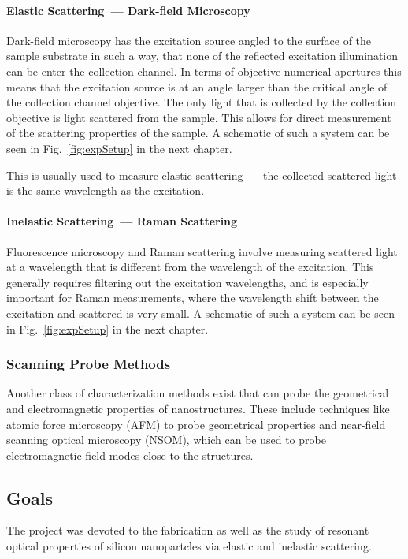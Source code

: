             \paragraph{Elastic Scattering~--- Dark-field Microscopy}
                    Dark-field microscopy has the excitation source angled to the surface of the sample substrate in such a way, that none of
                the reflected excitation illumination can be enter the collection channel. In terms of objective numerical apertures this
                means that the excitation source is at an angle larger than the critical angle of the collection channel objective. The only
                light that is collected by the collection objective is light scattered from the sample. This allows for direct measurement of
                the scattering properties of the sample. A schematic of such a system can be seen in Fig.~\ref{fig:expSetup} in the next chapter.

                    This is usually used to measure elastic scattering~--- the collected scattered light is the same wavelength as the excitation.
            \paragraph{Inelastic Scattering~--- Raman Scattering}
                    Fluorescence microscopy and Raman scattering involve measuring scattered light at a wavelength that is different from the
                wavelength of the excitation. This generally requires filtering out the excitation wavelengths, and is especially
                important for Raman measurements, where the wavelength shift between the excitation and scattered is very small.
                A schematic of such a system can be seen in Fig.~\ref{fig:expSetup} in the next chapter.

        \subsubsection{Scanning Probe Methods}
        \label{sec:SPM}
                Another class of characterization methods exist that can probe the geometrical and electromagnetic properties of nanostructures.
            These include techniques like atomic force microscopy (AFM) to probe geometrical properties and near-field scanning
            optical microscopy (NSOM), which can be used to probe electromagnetic field modes close to the structures.
    \clearpage
    \subsection{Goals}
            The project was devoted to the fabrication as well as the study of resonant optical properties of silicon nanopartcles
            via elastic and inelastic scattering.


